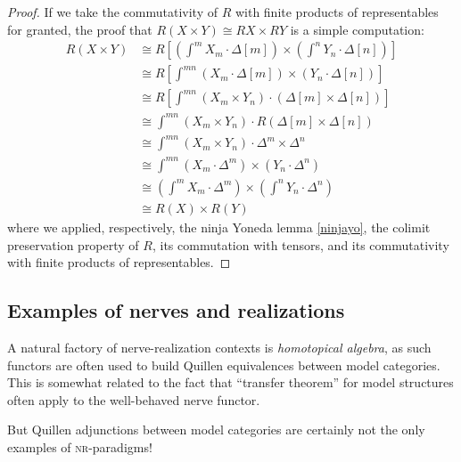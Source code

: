 \begin{proof}
If we take the commutativity of $R$ with finite products of representables for granted, the proof that $R(X\times Y)\cong RX\times RY$ is a simple computation:
\begin{align*}
R( X\times  Y) &\cong \textstyle R\left[ \left(\int^m X_m\cdot \Delta[m] \right )\times \left( \int^n Y_n\cdot \Delta[n]\right ) \right ]\\
&\cong\textstyle R\left[ \int^{mn} (X_m\cdot \Delta[m])\times (Y_n\cdot \Delta[n])\right]\\
&\cong\textstyle R\left[\int^{mn} (X_m\times Y_n)\cdot (\Delta[m]\times \Delta[n]) \right ]\\
&\cong\textstyle \int^{mn}(X_m\times Y_n)\cdot R(\Delta[m]\times \Delta[n])\\
&\cong\textstyle \int^{mn}(X_m\times Y_n)\cdot \Delta^m\times\Delta^n \\
&\cong\textstyle \int^{mn} (X_m\cdot\Delta^m)\times (Y_n\cdot \Delta^n)\\
&\cong\textstyle \left(\int^mX_m\cdot\Delta^m\right)\times \left(\int^n Y_n\cdot \Delta^n \right )\\
&\cong  R( X)\times R( Y)
\end{align*}
where we applied, respectively, the ninja Yoneda lemma \ref{ninjayo}, the colimit preservation property of $R$, its commutation with tensors, and its commutativity with finite products of representables.
\end{proof}
\subsection{Examples of nerves and realizations}
A natural factory of nerve\hyp{}realization contexts is \emph{homotopical algebra}, as such functors are often used to build Quillen equivalences between model categories. This is somewhat related to the fact that ``transfer theorem'' for model structures often apply to the well-behaved nerve functor.

But Quillen adjunctions between model categories are certainly not the only examples of \textsc{nr}-paradigms!

